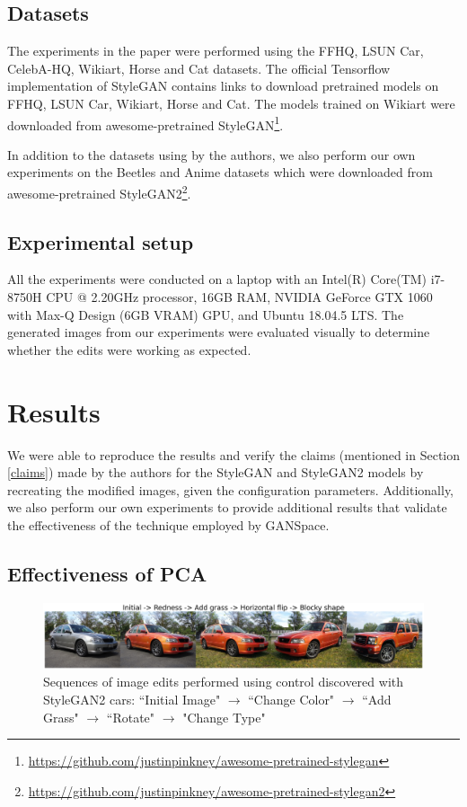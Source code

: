 \subsection{Datasets}

The experiments in the paper were performed using the FFHQ, LSUN Car, CelebA-HQ, Wikiart, Horse and Cat datasets. The official Tensorflow implementation of StyleGAN contains links to download pretrained models on FFHQ, LSUN Car, Wikiart, Horse and Cat. The models trained on Wikiart were downloaded from awesome-pretrained StyleGAN\footnote{\url{https://github.com/justinpinkney/awesome-pretrained-stylegan}}.

In addition to the datasets using by the authors, we also perform our own experiments on the Beetles and Anime datasets which were downloaded from awesome-pretrained StyleGAN2\footnote{\url{https://github.com/justinpinkney/awesome-pretrained-stylegan2}}.


\subsection{Experimental setup}

All the experiments were conducted on a laptop with an Intel(R) Core(TM) i7-8750H CPU @ 2.20GHz processor, 16GB RAM, NVIDIA GeForce GTX 1060 with Max-Q Design (6GB VRAM) GPU, and Ubuntu 18.04.5 LTS. The generated images from our experiments were evaluated visually to determine whether the edits were working as expected.

\section{Results}

We were able to reproduce the results and verify the claims (mentioned in Section \ref{claims}) made by the authors for the StyleGAN and StyleGAN2 models by recreating the modified images, given the configuration parameters. Additionally, we also perform our own experiments to provide additional results that validate the effectiveness of the technique employed by GANSpace.


\subsection{Effectiveness of PCA}

\begin{figure}[H]
    \centering
    \includegraphics[width=\textwidth]{figs/figure1_StyleGAN2_cars.png}
    \caption{Sequences of image edits performed using control discovered with StyleGAN2 cars: ``Initial Image" $\rightarrow$ ``Change Color" $\rightarrow$ ``Add Grass" $\rightarrow$ ``Rotate" $\rightarrow$ "Change Type"}
    \label{fig:cars}
\end{figure}

